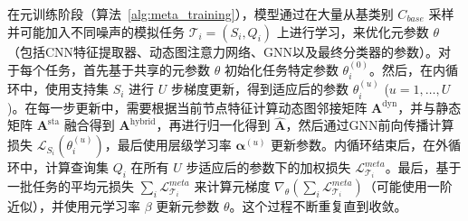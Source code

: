 在元训练阶段（算法~\ref{alg:meta_training}），模型通过在大量从基类别 $C_{base}$ 采样并可能加入不同噪声的模拟任务 $\mathcal{T}_i=(S_i, Q_i)$ 上进行学习，来优化元参数 $\theta$（包括CNN特征提取器、动态图注意力网络、GNN以及最终分类器的参数）。对于每个任务，首先基于共享的元参数 $\theta$ 初始化任务特定参数 $\theta_i^{(0)}$。然后，在内循环中，使用支持集 $S_i$ 进行 $U$ 步梯度更新，得到适应后的参数 $\theta_i^{(u)}$ ($u=1, \dots, U$)。在每一步更新中，需要根据当前节点特征计算动态图邻接矩阵 $\mathbf{A}^{\text{dyn}}$，并与静态矩阵 $\mathbf{A}^{\text{sta}}$ 融合得到 $\mathbf{A}^{\text{hybrid}}$，再进行归一化得到 $\hat{\mathbf{A}}$，然后通过GNN前向传播计算损失 $\mathcal{L}_{S_i}(\theta_i^{(u)})$，最后使用层级学习率 $\boldsymbol{\alpha}^{(u)}$ 更新参数。内循环结束后，在外循环中，计算查询集 $Q_i$ 在所有 $U$ 步适应后的参数下的加权损失 $\mathcal{L}_{\mathcal{T}_i}^{meta}$。最后，基于一批任务的平均元损失 $\sum_i \mathcal{L}_{\mathcal{T}_i}^{meta}$ 来计算元梯度 $\nabla_\theta (\sum_i \mathcal{L}_{\mathcal{T}_i}^{meta})$（可能使用一阶近似），并使用元学习率 $\beta$ 更新元参数 $\theta$。这个过程不断重复直到收敛。

